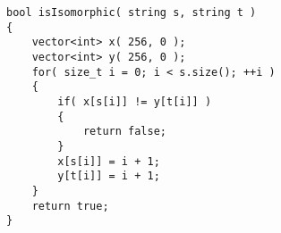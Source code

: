 \setcounter{lstlisting}{0}
\begin{lstlisting}[style=customc, caption={Two Hash Maps}]
bool isIsomorphic( string s, string t )
{
    vector<int> x( 256, 0 );
    vector<int> y( 256, 0 );
    for( size_t i = 0; i < s.size(); ++i )
    {
        if( x[s[i]] != y[t[i]] )
        {
            return false;
        }
        x[s[i]] = i + 1;
        y[t[i]] = i + 1;
    }
    return true;
}
\end{lstlisting}
